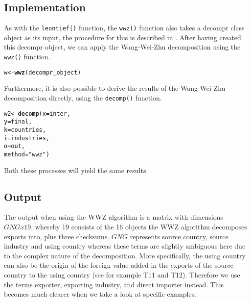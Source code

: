 \documentclass[a4paper]{article}\usepackage[]{graphicx}\usepackage[]{color}
\makeatletter
\newcommand{\hlstr}[1]{\textcolor[rgb]{0.192,0.494,0.8}{#1}}%
\newcommand{\hlstd}[1]{\textcolor[rgb]{0.345,0.345,0.345}{#1}}%
\newcommand{\hlkwb}[1]{\textcolor[rgb]{0.69,0.353,0.396}{#1}}%
\newcommand{\hlkwc}[1]{\textcolor[rgb]{0.333,0.667,0.333}{#1}}%
\newcommand{\hlkwd}[1]{\textcolor[rgb]{0.737,0.353,0.396}{\textbf{#1}}}%
\newenvironment{kframe}{%
 \def\at@end@of@kframe{}%
 \ifinner\ifhmode%
  \def\at@end@of@kframe{\end{minipage}}%
  \begin{minipage}{\columnwidth}%
 \fi\fi%
 \def\FrameCommand##1{\hskip\@totalleftmargin \hskip-\fboxsep
 \colorbox{shadecolor}{##1}\hskip-\fboxsep
     \hskip-\linewidth \hskip-\@totalleftmargin \hskip\columnwidth}%
 \MakeFramed {\advance\hsize-\width
   \@totalleftmargin\z@ \linewidth\hsize
   \@setminipage}}%
 {\par\unskip\endMakeFramed%
 \at@end@of@kframe}
\newenvironment{knitrout}{}{} %
\newcommand{\code}[1]{\texttt{#1}}
\makeatother
\begin{document}
\subsection{Implementation}

As with the \code{leontief()} function, the \code{wwz()} function
also takes a decompr class object as its input, the procedure for
this is described in . After having created this
decompr object, we can apply the Wang-Wei-Zhu decomposition using
the \code{wwz()} function.

\begin{knitrout}
\color{fgcolor}\begin{kframe}
\begin{alltt}
\hlstd{w} \hlkwb{<-} \hlkwd{wwz}\hlstd{(decompr_object)}
\end{alltt}
\end{kframe}
\end{knitrout}

Furthermore, it is also possible to derive the results of the Wang-Wei-Zhu
decomposition directly, using the \code{decomp()} function.

\begin{knitrout}
\color{fgcolor}\begin{kframe}
\begin{alltt}
\hlstd{w2} \hlkwb{<-}  \hlkwd{decomp}\hlstd{(} \hlkwc{x} \hlstd{= inter,}
               \hlkwc{y} \hlstd{= final,}
               \hlkwc{k} \hlstd{= countries,}
               \hlkwc{i} \hlstd{= industries,}
               \hlkwc{o} \hlstd{= out,}
               \hlkwc{method} \hlstd{=} \hlstr{"wwz"} \hlstd{)}
\end{alltt}
\end{kframe}
\end{knitrout}

Both these processes will yield the same results.

\subsection{Output}

The output when using the WWZ algorithm is a matrix with dimensions
$GNGx19$, whereby 19 consists of the 16 objects the WWZ algorithm
decomposes exports into, plus three checksums. $GNG$ represents source
country, source industry and using country whereas these terms are
slightly ambiguous here due to the complex nature of the decomposition.
More specifically, the using country can also be the origin of the
foreign value added in the exports of the source country to the using
country (see for example T11 and T12). Therefore we use the terms
exporter, exporting industry, and direct importer instead. This becomes
much clearer when we take a look at specific examples.
\end{document}
